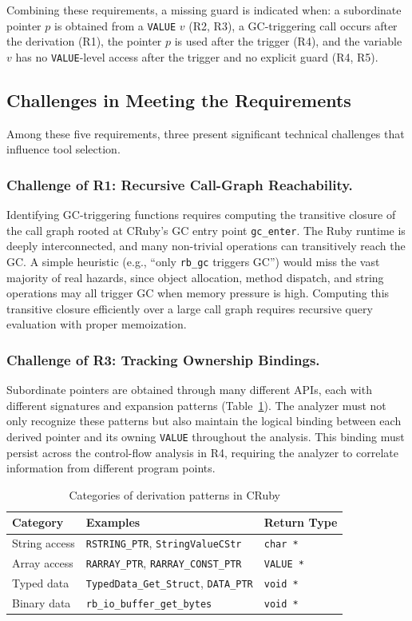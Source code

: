 Combining these requirements, a missing guard is indicated when: a subordinate pointer $p$ is obtained from a \texttt{VALUE} $v$ (R2, R3), a GC-triggering call occurs after the derivation (R1), the pointer $p$ is used after the trigger (R4), and the variable $v$ has no \texttt{VALUE}-level access after the trigger and no explicit guard (R4, R5).

\subsection{Challenges in Meeting the Requirements}

Among these five requirements, three present significant technical challenges that influence tool selection.

\subsubsection*{Challenge of R1: Recursive Call-Graph Reachability.}
Identifying GC-triggering functions requires computing the transitive closure of the call graph rooted at CRuby's GC entry point \texttt{gc\_enter}. The Ruby runtime is deeply interconnected, and many non-trivial operations can transitively reach the GC. A simple heuristic (e.g., ``only \texttt{rb\_gc} triggers GC'') would miss the vast majority of real hazards, since object allocation, method dispatch, and string operations may all trigger GC when memory pressure is high. Computing this transitive closure efficiently over a large call graph requires recursive query evaluation with proper memoization.

\subsubsection*{Challenge of R3: Tracking Ownership Bindings.}
Subordinate pointers are obtained through many different APIs, each with different signatures and expansion patterns (Table~\ref{tab:derivation_patterns}). The analyzer must not only recognize these patterns but also maintain the logical binding between each derived pointer and its owning \texttt{VALUE} throughout the analysis. This binding must persist across the control-flow analysis in R4, requiring the analyzer to correlate information from different program points.

\begin{table}[ht]
\centering
\caption{Categories of derivation patterns in CRuby}
\label{tab:derivation_patterns}
\begin{tabular}{lll}
\toprule
\textbf{Category} & \textbf{Examples} & \textbf{Return Type} \\
\midrule
String access & \texttt{RSTRING\_PTR}, \texttt{StringValueCStr} & \texttt{char *} \\
Array access & \texttt{RARRAY\_PTR}, \texttt{RARRAY\_CONST\_PTR} & \texttt{VALUE *} \\
Typed data & \texttt{TypedData\_Get\_Struct}, \texttt{DATA\_PTR} & \texttt{void *} \\
Binary data & \texttt{rb\_io\_buffer\_get\_bytes} & \texttt{void *} \\
\bottomrule
\end{tabular}
\end{table}

